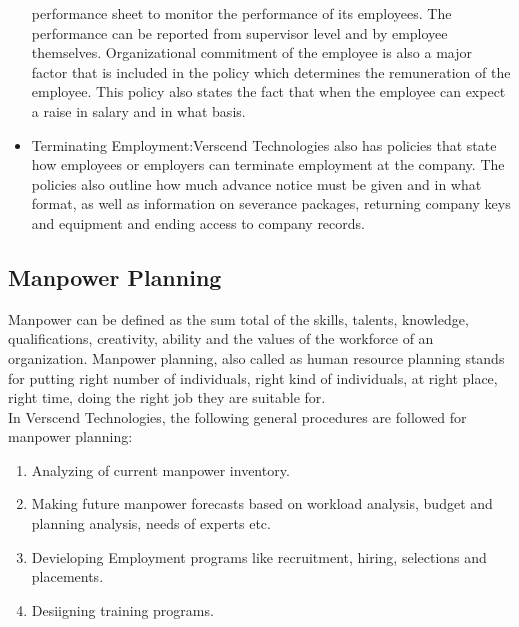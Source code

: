 \begin{itemize}
performance sheet to monitor the performance of its employees. The performance can be reported from
supervisor level and by employee themselves. Organizational commitment of the employee is also a
major factor that is included in the policy which determines the remuneration of the employee. This
policy also states the fact that when the employee can expect a raise in salary and in what basis.
\item Terminating Employment:Verscend Technologies also has policies that state how
employees or employers can terminate employment at the company. The policies also outline how
much advance notice must be given and in what format, as well as information on severance packages,
returning company keys and equipment and ending access to company records.
\end{itemize}
\subsection{Manpower Planning}
Manpower can be defined as the sum total of the skills, talents, knowledge, qualifications, creativity, ability
and the values of the workforce of an organization. Manpower planning, also called as human resource
planning stands for putting right number of individuals, right kind of individuals, at right place, right time,
doing the right job they are suitable for.
\\In Verscend Technologies, the following general procedures are followed for manpower planning:
\begin{enumerate}
\item
 Analyzing of current manpower inventory.
\item
 Making future manpower forecasts based on workload analysis, budget and planning analysis, needs
of experts etc.
\item
 Devieloping Employment programs like recruitment, hiring, selections and placements.
\item
 Desiigning training programs.
\end{enumerate}
